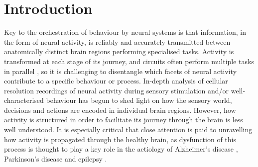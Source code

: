 \chapter{\label{ch:1-intro}Introduction} 
\minitoc

Key to the orchestration of behaviour by neural systems is that information, in the form of neural activity, is reliably and accurately transmitted between anatomically distinct brain regions performing specialised tasks. Activity is transformed at each stage of its journey, and circuits often perform multiple tasks in parallel \cite{mante_context-dependent_2013, stringer_spontaneous_2019}, so it is challenging to disentangle which facets of neural activity contribute to a specific behaviour or process. In-depth analysis of cellular resolution recordings of neural activity during sensory stimulation \cite{hubel_receptive_1962, simons_response_1978, carandini_linearity_1997, okun_diverse_2015, stringer_high-dimensional_2019}  and/or well-characterised behaviour \cite{britten_analysis_1992, platt_neural_1999, yang_probabilistic_2007, herzfeld_encoding_2015, lak_dopaminergic_2020} has begun to shed light on how the sensory world, decisions and actions are encoded in individual brain regions. However, how activity is structured in order to facilitate its journey through the brain is less well understood. It is especially critical that close attention is paid to unravelling how activity is propagated through the healthy brain, as dysfunction of this process is thought to play a key role in the aetiology of Alzheimer’s disease \cite{hazra_inhibitory_2013, busche_impairments_2016}, Parkinson’s disease\cite{mcgregor_circuit_2019} and epilepsy \cite{goldberg_mechanisms_2013}.

